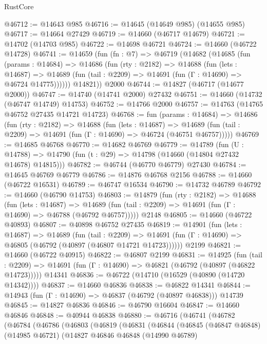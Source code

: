 \begin{lexlean}{RustCore}
\begin{coremodule}
@46712 := @14643 @985
@46716 := @14645 (@14649 @985) (@14655 @985)
@46717 := @14664 @27429
@46719 := @14660 (@46717 @14679)
@46721 := @14702 (@14703 @985)
@46722 := @14698 @46721
@46724 := @14660 (@46722 @14728)
@46741 := @14659
    (fun (fn : @7) =>
    @46719
      (@14682
        (@14685
          (fun (params : @14684) =>
          @14686
            (fun (rty : @2182) =>
            @14688
              (fun (lets : @14687) =>
              @14689 (fun (tail : @2209) => @14691 (fun (Γ : @14690) => @46724 @14775))))))
        @14821))
    @2000
@46744 := @14827 (@46717 (@14677 @2000))
@46747 := @14740 (@14741 @2000) @27432
@46751 := @14660 (@14732 (@46747 @14749) @14753)
@46752 := @14766 @2000
@46757 := @14763 (@14765 @46752 @27435 @14721 @14723)
@46768 := fun (params : @14684) =>
  @14686
    (fun (rty : @2182) =>
    @14688
      (fun (lets : @14687) =>
      @14689 (fun (tail : @2209) => @14691 (fun (Γ : @14690) => @46724 (@46751 @46757)))))
@46769 := @14685 @46768
@46770 := @14682 @46769
@46779 := @14789
    (fun (U : @14788) => @14790 (fun (t : @29) => @14798 (@14660 (@14804 @27432 @14678) @14815)))
@46782 := @46744 (@46770 @46779) @27430
@46784 := @14645 @46769 @46779
@46786 := @14876 @46768 @2156
@46788 := @14660 (@46722 @16531)
@46789 := @46747 @16534
@46790 := @14732 @46789
@46792 := @14660 (@46790 @14753)
@46803 := @14879
    (fun (rty : @2182) =>
    @14688
      (fun (lets : @14687) =>
      @14689 (fun (tail : @2209) => @14691 (fun (Γ : @14690) => @46788 (@46792 @46757)))))
    @2148
@46805 := @14660 (@46722 @40893)
@46807 := @40898 @46752 @27435
@46819 := @14901
    (fun (lets : @14687) =>
    @14689
      (fun (tail : @2209) =>
      @14691 (fun (Γ : @14690) => @46805 (@46792 (@40897 (@46807 @14721 @14723))))))
    @2199
@46821 := @14660 (@46722 @40915)
@46822 := @46807 @2199
@46831 := @14925
    (fun (tail : @2209) => @14691 (fun (Γ : @14690) => @46821 (@46792 (@40897 (@46822 @14723)))))
    @14341
@46836 := @46722 (@14710 (@16529 (@40890 (@14720 @14342))))
@46837 := @14660 @46836
@46838 := @46822 @14341
@46844 := @14943 (fun (Γ : @14690) => @46837 (@46792 (@40897 @46838))) @14739
@46845 := @14827 @46836
@46846 := @46790 @16604
@46847 := @14660 @46846
@46848 := @40944 @46838
@46880 := @46716
    (@46741
      (@46782
        (@46784
          (@46786
            (@46803
              (@46819
                (@46831
                  (@46844
                    (@46845
                      (@46847 @46848)
                      (@14985 @46721)
                      (@14827
                        @46846
                        @46848
                        (@14990 @46789)

\end{coremodule}
\end{lexlean}
